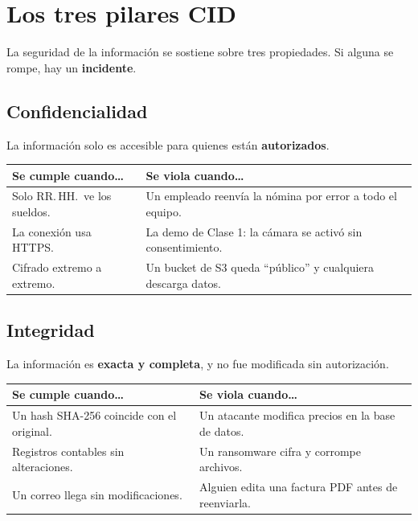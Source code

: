 \documentclass[12pt,a4paper]{article}
\renewcommand{\arraystretch}{1.25}
\begin{document}
\newpage
\section{Los tres pilares CID}

La seguridad de la informaci\'on se sostiene sobre tres propiedades.
Si alguna se rompe, hay un \textbf{incidente}.

\subsection{Confidencialidad}
\begin{cajaDefinicion}
La informaci\'on solo es accesible para quienes est\'an \textbf{autorizados}.
\end{cajaDefinicion}

\renewcommand{\arraystretch}{1.5}
\begin{tabularx}{\textwidth}{XX}
\toprule
\textbf{Se cumple cuando\ldots} & \textbf{Se viola cuando\ldots} \\
\midrule
Solo RR.\,HH.\ ve los sueldos. &
Un empleado reenv\'ia la n\'omina por error a todo el equipo. \\[4pt]
La conexi\'on usa HTTPS. &
La demo de Clase 1: la c\'amara se activ\'o sin consentimiento. \\[4pt]
Cifrado extremo a extremo. &
Un bucket de S3 queda ``p\'ublico'' y cualquiera descarga datos. \\
\bottomrule
\end{tabularx}

\subsection{Integridad}
\begin{cajaDefinicion}
La informaci\'on es \textbf{exacta y completa}, y no fue modificada sin autorizaci\'on.
\end{cajaDefinicion}

\renewcommand{\arraystretch}{1.5}
\begin{tabularx}{\textwidth}{XX}
\toprule
\textbf{Se cumple cuando\ldots} & \textbf{Se viola cuando\ldots} \\
\midrule
Un hash SHA-256 coincide con el original. &
Un atacante modifica precios en la base de datos. \\[4pt]
Registros contables sin alteraciones. &
Un ransomware cifra y corrompe archivos. \\[4pt]
Un correo llega sin modificaciones. &
Alguien edita una factura PDF antes de reenviarla. \\
\bottomrule
\end{tabularx}
\end{document}
